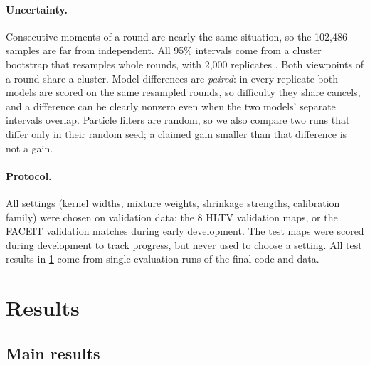 \documentclass[11pt]{article}
\newcommand{\1}{\mathbb{1}}
\begin{document}
\paragraph{Uncertainty.} Consecutive moments of a round are nearly the same situation, so the 102{,}486 samples are far from independent. All 95\% intervals come from a cluster bootstrap that resamples whole rounds, with 2{,}000 replicates \citep{field2007bootstrapping}. Both viewpoints of a round share a cluster. Model differences are \emph{paired}: in every replicate both models are scored on the same resampled rounds, so difficulty they share cancels, and a difference can be clearly nonzero even when the two models' separate intervals overlap. Particle filters are random, so we also compare two runs that differ only in their random seed; a claimed gain smaller than that difference is not a gain.

\paragraph{Protocol.} All settings (kernel widths, mixture weights, shrinkage strengths, calibration family) were chosen on validation data: the 8 HLTV validation maps, or the FACEIT validation matches during early development. The test maps were scored during development to track progress, but never used to choose a setting. All test results in \cref{sec:results} come from single evaluation runs of the final code and data.

\section{Results}
\label{sec:results}

\subsection{Main results}
\label{sec:main}
\end{document}

